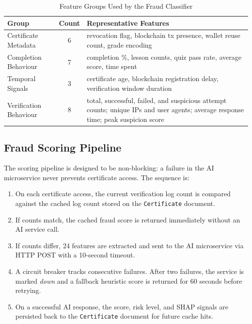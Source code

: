\documentclass[conference]{IEEEtran}
\begin{document}
\begin{table}[htbp]
\caption{Feature Groups Used by the Fraud Classifier}
\label{tab:features}
\begin{center}
\begin{tabular}{lcp{4.2cm}}
\toprule
\textbf{Group} & \textbf{Count} & \textbf{Representative Features} \\
\midrule
Certificate Metadata   & 6 & revocation flag, blockchain tx presence,
                             wallet reuse count, grade encoding \\
Completion Behaviour   & 7 & completion \%, lesson counts, quiz pass
                             rate, average score, time spent \\
Temporal Signals       & 3 & certificate age, blockchain registration
                             delay, verification window duration \\
Verification Behaviour & 8 & total, successful, failed, and suspicious
                             attempt counts; unique IPs and user agents;
                             average response time; peak suspicion score \\
\bottomrule
\end{tabular}
\end{center}
\end{table}

\subsection{Fraud Scoring Pipeline}

The scoring pipeline is designed to be non-blocking: a failure in
the AI microservice never prevents certificate access. The sequence
is:

\begin{enumerate}
    \item On each certificate access, the current verification log
    count is compared against the cached log count stored on the
    \texttt{Certificate} document.
    \item If counts match, the cached fraud score is returned
    immediately without an AI service call.
    \item If counts differ, 24 features are extracted and sent to
    the AI microservice via HTTP POST with a 10-second timeout.
    \item A circuit breaker tracks consecutive failures. After two
    failures, the service is marked \textit{down} and a fallback
    heuristic score is returned for 60 seconds before retrying.
    \item On a successful AI response, the score, risk level, and
    SHAP signals are persisted back to the \texttt{Certificate}
    document for future cache hits.
\end{enumerate}
\end{document}
